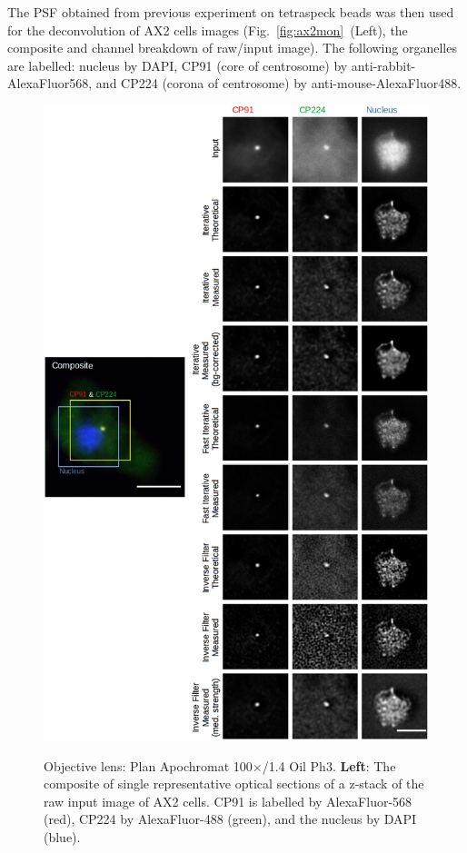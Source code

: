 The PSF obtained from previous experiment on tetraspeck beads was then used for the deconvolution of AX2 cells images (Fig.~\ref{fig:ax2mon}~(Left), the composite and channel breakdown of raw/input image). 
The following organelles are labelled: nucleus by DAPI, CP91 (core of centrosome) by anti-rabbit-AlexaFluor568, and CP224 (corona of centrosome) by anti-mouse-AlexaFluor488.

\begin{figure}
\centering
\includegraphics[height=0.85\textheight]{Exp_7_Deconvolution/Figures/montagemerged3t}\\
\caption{Objective lens: Plan Apochromat 100$\times$/1.4 Oil Ph3. \textbf{Left}: The composite of single representative optical sections of a z-stack of the raw input image of AX2 cells. CP91 is labelled by AlexaFluor-568 (red), CP224 by AlexaFluor-488 (green), and the nucleus by DAPI (blue). 
}
\end{figure}
